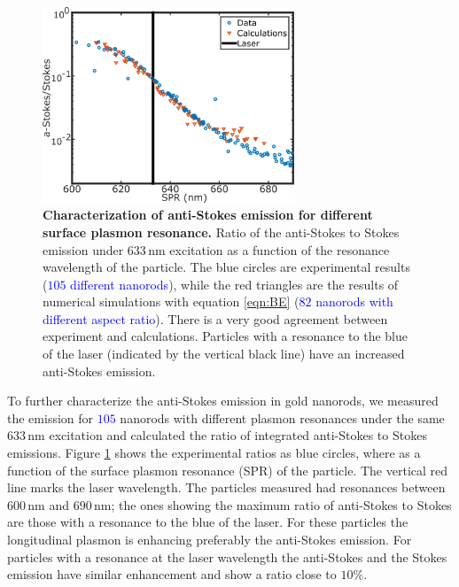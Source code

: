 \documentclass[journal=nalefd,manuscript=letter]{achemso}
\newcommand{\HI}[1]{\textcolor{blue}{#1}} %
\newcommand{\nm}{\ensuremath{\,\textrm{nm}}}
\begin{document}
\begin{figure}[tp] \centering
\includegraphics[width=75.5mm]{Figures/02_AS_vs_S_SPR/02_AS_vs_S_SPR.png}
\caption{\textbf{Characterization of anti-Stokes emission for different surface plasmon resonance.} 
Ratio of the anti-Stokes to Stokes emission under $633\nm$ excitation
as a function of the resonance wavelength of the particle.
The blue circles are experimental results (\HI{$105$ different nanorods}), while the red triangles are the
results of numerical simulations with equation \ref{eqn:BE} (\HI{$82$ nanorods with different aspect ratio}). 
There is a very good agreement between experiment and calculations. Particles with a resonance
to the blue of the laser (indicated by the vertical black line) have an increased anti-Stokes
emission.}
	\label{fig:ASS-ratio}
\end{figure}

To further characterize the anti-Stokes emission in gold nanorods, we measured the emission for \HI{$105$}
nanorods with different plasmon resonances under the same $633\nm$ excitation
and calculated the ratio of integrated anti-Stokes to Stokes emissions.
Figure \ref{fig:ASS-ratio} shows the experimental ratios as blue circles, where
as a function of the surface plasmon resonance (SPR) of the
particle. The vertical red line marks the laser wavelength. The particles measured 
had resonances between $600\nm$ and $690\nm$; the ones showing the
maximum ratio of anti-Stokes to Stokes are those with a resonance to the blue of
the laser. For these particles the longitudinal plasmon is enhancing preferably the
anti-Stokes emission. For particles with a resonance at the laser wavelength the
anti-Stokes and the Stokes emission have similar enhancement and show a ratio
close to $10\%$.
\end{document}
